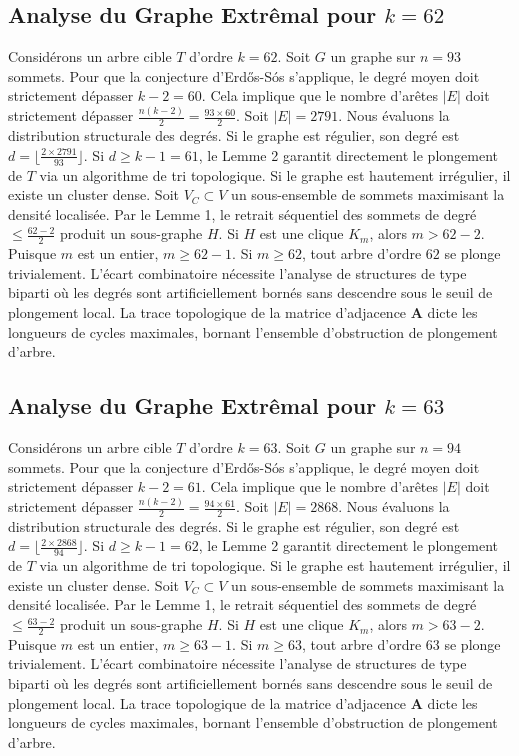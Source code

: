 \documentclass[11pt,a4paper]{article}
\begin{document}
\subsection{Analyse du Graphe Extr\^emal pour $k=62$}
Consid\'erons un arbre cible $T$ d'ordre $k=62$.
Soit $G$ un graphe sur $n=93$ sommets.
Pour que la conjecture d'Erd\H{o}s-S\'os s'applique, le degr\'e moyen doit strictement d\'epasser $k-2 = 60$.
Cela implique que le nombre d'ar\^etes $|E|$ doit strictement d\'epasser $\frac{n(k-2)}{2} = \frac{93 \times 60}{2}$.
Soit $|E| = 2791$.
Nous \'evaluons la distribution structurale des degr\'es. Si le graphe est r\'egulier, son degr\'e est $d = \lfloor \frac{2 \times 2791}{93} \rfloor$.
Si $d \geq k-1 = 61$, le Lemme 2 garantit directement le plongement de $T$ via un algorithme de tri topologique.
Si le graphe est hautement irr\'egulier, il existe un cluster dense. Soit $V_C \subset V$ un sous-ensemble de sommets maximisant la densit\'e localis\'ee.
Par le Lemme 1, le retrait s\'equentiel des sommets de degr\'e $\leq \frac{62-2}{2}$ produit un sous-graphe $H$.
Si $H$ est une clique $K_{m}$, alors $m > 62-2$. Puisque $m$ est un entier, $m \geq 62-1$. Si $m \geq 62$, tout arbre d'ordre $62$ se plonge trivialement.
L'\'ecart combinatoire n\'ecessite l'analyse de structures de type biparti o\`u les degr\'es sont artificiellement born\'es sans descendre sous le seuil de plongement local. La trace topologique de la matrice d'adjacence $\mathbf{A}$ dicte les longueurs de cycles maximales, bornant l'ensemble d'obstruction de plongement d'arbre.


\subsection{Analyse du Graphe Extr\^emal pour $k=63$}
Consid\'erons un arbre cible $T$ d'ordre $k=63$.
Soit $G$ un graphe sur $n=94$ sommets.
Pour que la conjecture d'Erd\H{o}s-S\'os s'applique, le degr\'e moyen doit strictement d\'epasser $k-2 = 61$.
Cela implique que le nombre d'ar\^etes $|E|$ doit strictement d\'epasser $\frac{n(k-2)}{2} = \frac{94 \times 61}{2}$.
Soit $|E| = 2868$.
Nous \'evaluons la distribution structurale des degr\'es. Si le graphe est r\'egulier, son degr\'e est $d = \lfloor \frac{2 \times 2868}{94} \rfloor$.
Si $d \geq k-1 = 62$, le Lemme 2 garantit directement le plongement de $T$ via un algorithme de tri topologique.
Si le graphe est hautement irr\'egulier, il existe un cluster dense. Soit $V_C \subset V$ un sous-ensemble de sommets maximisant la densit\'e localis\'ee.
Par le Lemme 1, le retrait s\'equentiel des sommets de degr\'e $\leq \frac{63-2}{2}$ produit un sous-graphe $H$.
Si $H$ est une clique $K_{m}$, alors $m > 63-2$. Puisque $m$ est un entier, $m \geq 63-1$. Si $m \geq 63$, tout arbre d'ordre $63$ se plonge trivialement.
L'\'ecart combinatoire n\'ecessite l'analyse de structures de type biparti o\`u les degr\'es sont artificiellement born\'es sans descendre sous le seuil de plongement local. La trace topologique de la matrice d'adjacence $\mathbf{A}$ dicte les longueurs de cycles maximales, bornant l'ensemble d'obstruction de plongement d'arbre.
\end{document}
